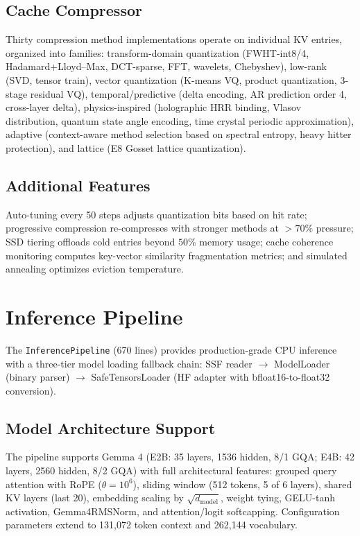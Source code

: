 \documentclass[11pt,a4paper,twocolumn]{article}
\begin{document}
\subsection{Cache Compressor}
Thirty compression method implementations operate on individual KV entries, organized into families: transform-domain quantization (FWHT-int8/4, Hadamard+Lloyd--Max, DCT-sparse, FFT, wavelets, Chebyshev), low-rank (SVD, tensor train), vector quantization (K-means VQ, product quantization, 3-stage residual VQ), temporal/predictive (delta encoding, AR prediction order 4, cross-layer delta), physics-inspired (holographic HRR binding, Vlasov distribution, quantum state angle encoding, time crystal periodic approximation), adaptive (context-aware method selection based on spectral entropy, heavy hitter protection), and lattice (E8 Gosset lattice quantization).

\subsection{Additional Features}
Auto-tuning every 50 steps adjusts quantization bits based on hit rate; progressive compression re-compresses with stronger methods at $>70\%$ pressure; SSD tiering offloads cold entries beyond $50\%$ memory usage; cache coherence monitoring computes key-vector similarity fragmentation metrics; and simulated annealing optimizes eviction temperature.

\section{Inference Pipeline}
\label{sec:inference}

The \texttt{InferencePipeline} (670 lines) provides production-grade CPU inference with a three-tier model loading fallback chain: SSF reader $\to$ ModelLoader (binary parser) $\to$ SafeTensorsLoader (HF adapter with bfloat16-to-float32 conversion).

\subsection{Model Architecture Support}
The pipeline supports Gemma 4 (E2B: 35 layers, 1536 hidden, 8/1 GQA; E4B: 42 layers, 2560 hidden, 8/2 GQA) with full architectural features: grouped query attention with RoPE ($\theta=10^6$), sliding window (512 tokens, 5 of 6 layers), shared KV layers (last 20), embedding scaling by $\sqrt{d_\text{model}}$, weight tying, GELU-tanh activation, Gemma4RMSNorm, and attention/logit softcapping. Configuration parameters extend to 131,072 token context and 262,144 vocabulary.
\end{document}
